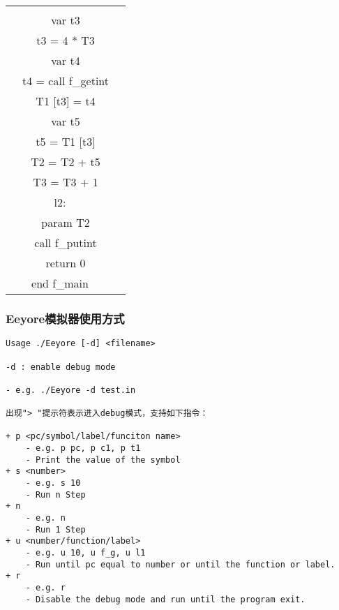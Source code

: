 \begin{table}[H]
\begin{typewriterfont}
\begin{tabular}{|c|c|}
{\ \ if t2 == 0 goto l2\\
\ \ var t3\\
\ \ t3 = 4 * T3\\
\ \ var t4\\
\ \ t4 = call f\_getint\\
\ \ T1 [t3] = t4\\
\ \ var t5\\
\ \ t5 = T1 [t3]\\
\ \ T2 = T2 + t5\\
\ \ T3 = T3 + 1\\
l2:\\
\ \ param T2\\
\ \ call f\_putint\\
\ \ return 0\\
end f\_main
} \\
        \hline
    \end{tabular}
    \end{typewriterfont}
\end{table}

\newpage
\subsubsection{Eeyore模拟器使用方式}
\begin{typewriterfont}
\begin{lstlisting}
Usage ./Eeyore [-d] <filename>

-d : enable debug mode

- e.g. ./Eeyore -d test.in

出现"> "提示符表示进入debug模式，支持如下指令： 

+ p <pc/symbol/label/funciton name>     
    - e.g. p pc, p c1, p t1
    - Print the value of the symbol
+ s <number>
    - e.g. s 10
    - Run n Step
+ n
    - e.g. n
    - Run 1 Step
+ u <number/function/label>
    - e.g. u 10, u f_g, u l1
    - Run until pc equal to number or until the function or label.
+ r
    - e.g. r
    - Disable the debug mode and run until the program exit.
\end{lstlisting}
\end{typewriterfont}
